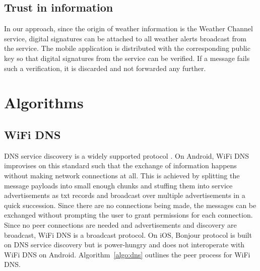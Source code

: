 \documentclass[conference]{IEEEtran}
\begin{document}
%
\subsection{Trust in information}
\label{sec:trust}
%
In our approach, since the origin of weather information is the
Weather Channel service, digital signatures can be attached to all
weather alerts broadcast from the service. The mobile application is
distributed with the corresponding public key so that digital
signatures from the service can be verified. If a message fails such a
verification, it is discarded and not forwarded any further.
%
\section{Algorithms}
\label{sec:algo}
%
\subsection{WiFi DNS}
\label{sec:wifi}
%
DNS service discovery is a widely supported
protocol \cite{cheshire-dns-sd-2013}. On Android, WiFi DNS improvises
on this standard such that the exchange of information happens without
making network connections at all. This is achieved by splitting the
message payloads into small enough chunks and stuffing them into
service advertisements as txt records and broadcast over multiple
advertisements in a quick succession. Since there are no connections
being made, the messages can be exchanged without prompting the user
to grant permissions for each connection. Since no peer connections
are needed and advertisements and discovery are broadcast, WiFi DNS is
a broadcast protocol. On iOS, Bonjour protocol is built on DNS service
discovery but is power-hungry and does not interoperate with WiFi DNS
on Android. Algorithm~\ref{algo:dns} outlines the peer process for
WiFi DNS.
\end{document}
